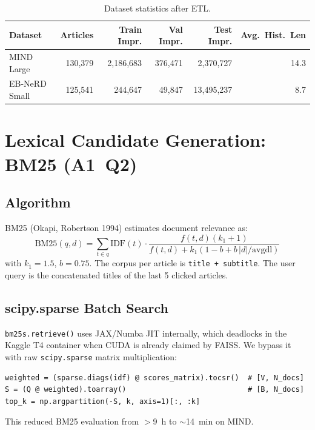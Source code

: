 \documentclass[11pt,a4paper]{article}
\begin{document}
\begin{table}[h]
\centering
\caption{Dataset statistics after ETL.}
\label{tab:datasets}
\begin{tabular}{lrrrrr}
\toprule
Dataset & Articles & Train Impr. & Val Impr. & Test Impr. & Avg.\ Hist.\ Len \\
\midrule
MIND Large   & 130,379 & 2,186,683 &   376,471 &  2,370,727 & 14.3 \\
EB-NeRD Small & 125,541 &   244,647 &    49,847 & 13,495,237 &  8.7 \\
\bottomrule
\end{tabular}
\end{table}

\section{Lexical Candidate Generation: BM25 (A1~Q2)}

\subsection{Algorithm}

BM25 (Okapi, Robertson 1994) estimates document relevance as:
\begin{equation}
\text{BM25}(q, d) = \sum_{t \in q} \text{IDF}(t) \cdot
  \frac{f(t,d)(k_1+1)}{f(t,d)+k_1(1-b+b\,|d|/\text{avgdl})}
\end{equation}
with $k_1=1.5$, $b=0.75$. The corpus per article is \texttt{title + subtitle}.
The user query is the concatenated titles of the last 5 clicked articles.

\subsection{scipy.sparse Batch Search}

\texttt{bm25s.retrieve()} uses JAX/Numba JIT internally, which deadlocks in the
Kaggle T4 container when CUDA is already claimed by FAISS. We bypass it with raw
\texttt{scipy.sparse} matrix multiplication:
\begin{lstlisting}
weighted = (sparse.diags(idf) @ scores_matrix).tocsr()  # [V, N_docs]
S = (Q @ weighted).toarray()                            # [B, N_docs]
top_k = np.argpartition(-S, k, axis=1)[:, :k]
\end{lstlisting}
This reduced BM25 evaluation from $>$9~h to $\sim$14~min on MIND.
\end{document}
